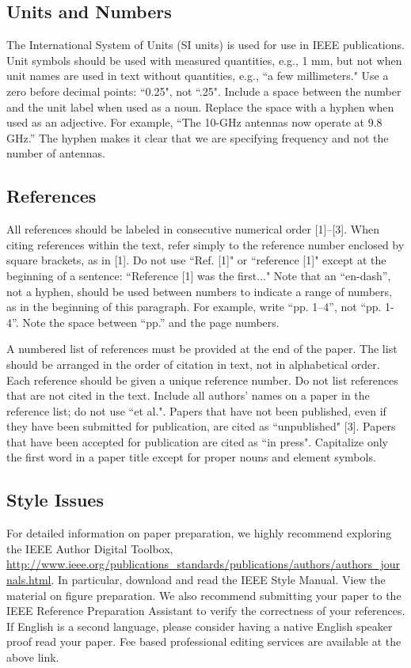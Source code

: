 \documentclass[conference, 10pt]{IEEEtran}
\begin{document}
\subsection{Units and Numbers}
The International System of Units (SI units) is used for use in IEEE publications. Unit symbols should be used with measured quantities, e.g., 1 mm, but not when unit names are used in text without quantities, e.g., ``a few millimeters." Use a zero before decimal points: ``0.25", not ``.25". Include a space between the number and the unit label when used as a noun. Replace the space with a hyphen when used as an adjective. For example, ``The 10-GHz antennas now operate at 9.8 GHz.'' The hyphen makes it clear that we are specifying frequency and not the number of antennas.

\subsection{References}
All references should be labeled in consecutive numerical order [1]--[3]. When citing references within the text, refer simply to the reference number enclosed by square brackets, as in [1].  Do not use ``Ref. [1]" or ``reference [1]" except at the beginning of a sentence: ``Reference [1] was the first..." Note that an ``en-dash'', not a hyphen, should be used between numbers to indicate a range of numbers, as in the beginning of this paragraph. For example, write ``pp. 1--4'', not ``pp. 1-4''. Note the space between ``pp.'' and the page numbers.

A numbered list of references must be provided at the end of the paper. The list should be arranged in the order of citation in text, not in alphabetical order. Each reference should be given a unique reference number. Do not list references that are not cited in the text. Include all authors' names on a paper in the reference list; do not use ``et al.". Papers that have not been published, even if they have been submitted for publication, are cited as ``unpublished" [3]. Papers that have been accepted for publication are cited as ``in press". Capitalize only the first word in a paper title except for proper nouns and element symbols.

\subsection{Style Issues}
For detailed information on paper preparation, we highly recommend exploring the IEEE Author Digital Toolbox,
\url{http://www.ieee.org/publications_standards/publications/authors/authors_journals.html}. In particular, download and read the
IEEE Style Manual. View the material on figure preparation. We also recommend submitting your paper to the IEEE
Reference Preparation Assistant to verify the correctness of your references. If English is a second language, please
consider having a native English speaker proof read your paper. Fee based professional editing services are available at the
above link.
\end{document}
